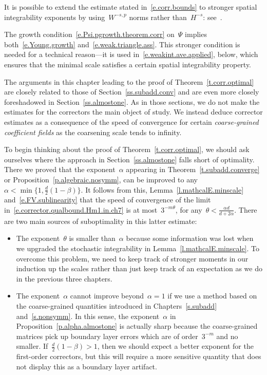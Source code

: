 \documentclass[11pt,twoside]{article} %
\numberwithin{equation}{section}
\theoremstyle{definition}
\begin{document}
\smallskip

It is possible to extend the estimate stated in~\eqref{e.corr.bounds} to stronger spatial integrability exponents by using~$W^{-s,p}$ norms rather than~$H^{-s}$: see~\cite[Theorem 4.24]{AKMBook}.

\smallskip

The growth condition~\eqref{e.Psi.pgrowth.theorem.corr} on~$\Psi$ implies both~\eqref{e.Young.growth} and~\eqref{e.weak.triangle.ass}. This stronger condition is needed for a technical reason---it is used in~\eqref{e.weakint.ave.applied}, below, which ensures that the minimal scale satisfies a certain spatial integrability property. 

\smallskip

The arguments in this chapter leading to the proof of Theorem~\ref{t.corr.optimal} are closely related to those of Section~\ref{ss.subadd.conv} and are even more closely foreshadowed in Section~\ref{ss.almostone}. As in those sections, we do not make the estimates for the correctors the main object of study. We instead deduce corrector estimates as a consequence of the speed of convergence for certain \emph{coarse-grained coefficient fields} as the coarsening scale tends to infinity. 

\smallskip

To begin thinking about the proof of Theorem~\ref{t.corr.optimal}, we should ask ourselves where the approach in Section~\ref{ss.almostone} falls short of optimality. There we proved that the exponent~$\alpha$ appearing in Theorem~\ref{t.subadd.converge} or Proposition~\ref{p.algebraic.nosymm},  can be improved to any~$\alpha < \min\{ 1 , \frac d2(1-\beta)\}$. It follows from this, Lemma~\ref{l.mathcalE.minscale} and~\eqref{e.FV.sublinearity} that the speed of convergence of the limit in~\eqref{e.corrector.qualbound.Hm1.in.ch7} is at most~$3^{-m\theta}$, for any~$\theta < \frac{\alpha d}{d+2\alpha}$. There are two main sources of suboptimality in this latter estimate:

\begin{itemize}

\item The exponent~$\theta$ is smaller than~$\alpha$ because some information was lost when we upgraded the stochastic integrability in Lemma~\ref{l.mathcalE.minscale}. To overcome this problem, we need to keep track of stronger moments in our induction up the scales rather than just keep track of an expectation as we do in the previous three chapters. 

\item The exponent~$\alpha$ cannot improve beyond~$\alpha=1$ if we use a method based on the coarse-grained quantities introduced in Chapters~\ref{s.subadd} and~\ref{s.nonsymm}. In this sense, the exponent~$\alpha$ in Proposition~\ref{p.alpha.almostone} is actually sharp because the coarse-grained matrices pick up boundary layer errors which are of order~$3^{-m}$ and no smaller. If~$\frac d2(1-\beta) > 1$, then we should expect a better exponent for the first-order correctors, but this will require a more sensitive quantity that does not display this as a boundary layer artifact. 

\end{itemize}
\end{document}
